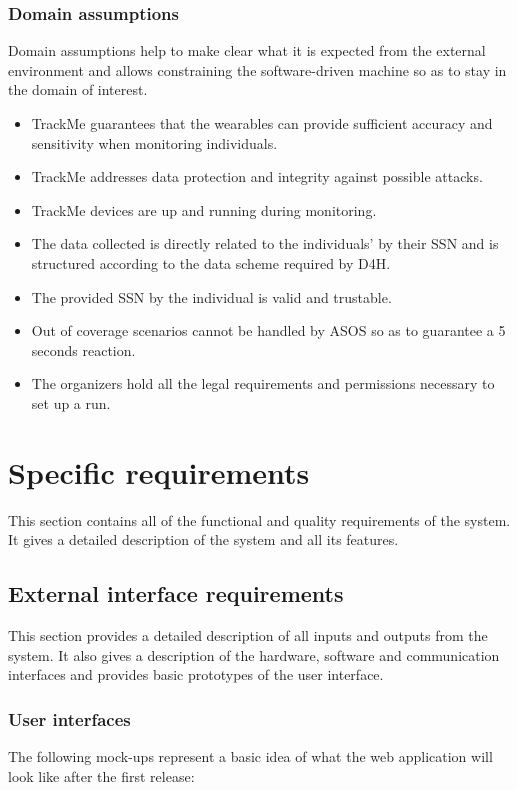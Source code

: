 \documentclass[a4paper, hidelinks, 12pt]{report}
\newcommand\assumption[1]{\item[{[D#1]}] }
\begin{document}
	\subsection{Domain assumptions}
	Domain assumptions help to make clear what it is expected from the external environment and allows constraining the software-driven machine so as to stay in the domain of interest.
	\begin{itemize}
		\assumption{1} TrackMe guarantees that the wearables can provide sufficient accuracy and sensitivity when monitoring individuals.
		\assumption{2} TrackMe addresses data protection and integrity against possible attacks.
		\assumption{3} TrackMe devices are up and running during monitoring.
		\assumption{4} The data collected is directly related to the individuals' by their SSN and is structured according to the data scheme required by D4H.
		\assumption{5} The provided SSN by the individual is valid and trustable.
		\assumption{6} Out of coverage scenarios cannot be handled by ASOS so as to guarantee a 5 seconds reaction.
		\assumption{7} The organizers hold all the legal requirements and permissions necessary to set up a run.
	\end{itemize}
	
	\chapter{Specific requirements}
	This section contains all of the functional and quality requirements of the system. It gives a detailed
	description of the system and all its features.
	
	\section{External interface requirements}
	This section provides a detailed description of all inputs and outputs from the system. It also gives a
	description of the hardware, software and communication interfaces and provides basic prototypes of the
	user interface.
	
	\subsection{User interfaces}
	The following mock-ups represent a basic idea of what the web application will look like after the first release:\\\\
	
\end{document}
